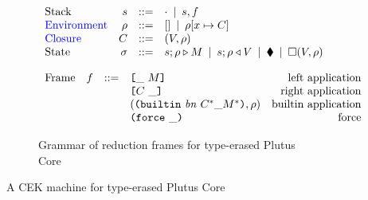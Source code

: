 \documentclass[../plutus-core-specification.tex]{subfiles}
\begin{document}
\begin{figure}[H]
\begin{subfigure}[c]{\linewidth}
    \centering
    \[\begin{array}{lrclr}
        \textrm{Stack} & s      & ::= & \cdot \enspace | \enspace s,f\\
 \textcolor{blue}{ \textrm{Environment}} & \rho & ::= & [] \enspace | \enspace \rho[x \mapsto C] \\
        \textcolor{blue}{ \textrm{Closure}} & C  & ::= & (V,\rho) \\
        \textrm{State} & \sigma & ::= & s;\rho \triangleright M \enspace | \enspace s;\rho \triangleleft V  \enspace | \enspace \blacklozenge{} \enspace | \enspace \square (V,\rho)\\
    \end{array}\]

    \label{fig:untyped-cek-frames}
\end{subfigure}
\begin{subfigure}[c]{\linewidth}
    \centering
    \[\begin{array}{lrclr}
        \textrm{Frame} & f  & ::=   & \texttt{[} \_ ~ M \texttt{]}                  & \textrm{left application}\\
                       &   &     & \texttt{[} C ~ \_ \texttt{]}                    & \textrm{right application}\\
                       &   &     & (\texttt{(} \texttt{builtin} ~ \mathit{bn} ~ C^* \_ M^* \texttt{)}, \rho)  & \textrm{builtin application}\\
                       &   &     & \texttt{(} \texttt{force} ~ \_ \texttt{)}                          & \textrm{force}
    \end{array}\]
    \caption{Grammar of reduction frames for type-erased Plutus Core}
    \label{fig:untyped-cek-reduction-frames}
\end{subfigure}
\caption{A CEK machine for type-erased Plutus Core}
\end{figure}
\end{document}

